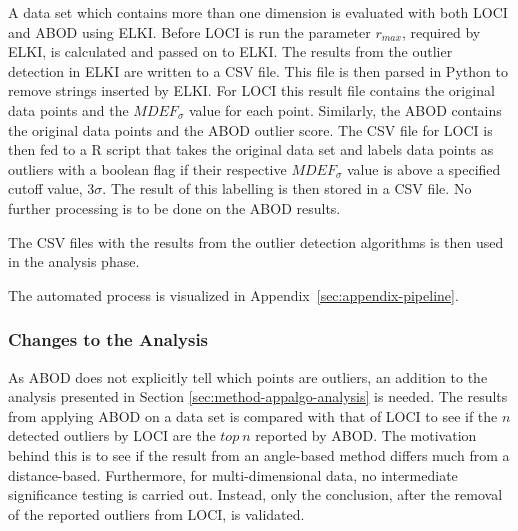 A data set which contains more than one dimension is evaluated with both LOCI and ABOD using ELKI\@. Before LOCI is run the parameter $r_{max}$, required by ELKI, is calculated and passed on to ELKI\@. The results from the outlier detection in ELKI are written to a CSV file. This file is then parsed in \textsf{Python} to remove strings inserted by ELKI\@. For LOCI this result file contains the original data points and the $MDEF_{\sigma}$ value for each point. Similarly, the ABOD contains the original data points and the ABOD outlier score. The CSV file for LOCI is then fed to a \textsf{R} script that takes the original data set and labels data points as outliers with a boolean flag if their respective $MDEF_{\sigma}$ value is above a specified cutoff value, $3\sigma$. The result of this labelling is then stored in a CSV file. No further processing is to be done on the ABOD results.


The CSV files with the results from the outlier detection algorithms is then used in the analysis phase.


The automated process is visualized in Appendix~\ref{sec:appendix-pipeline}.


\subsubsection{Changes to the Analysis}
\label{sec:resultsprestudy-changestotheanalysis}
As ABOD does not explicitly tell which points are outliers, an addition to the analysis presented in Section \ref{sec:method-appalgo-analysis} is needed. The results from applying ABOD on a data set is compared with that of LOCI to see if the $n$ detected outliers by LOCI are the $top\ n$ reported by ABOD\@. The motivation behind this is to see if the result from an angle-based method differs much from a distance-based. Furthermore, for multi-dimensional data, no intermediate significance testing is carried out. Instead, only the conclusion, after the removal of the reported outliers from LOCI, is validated.
